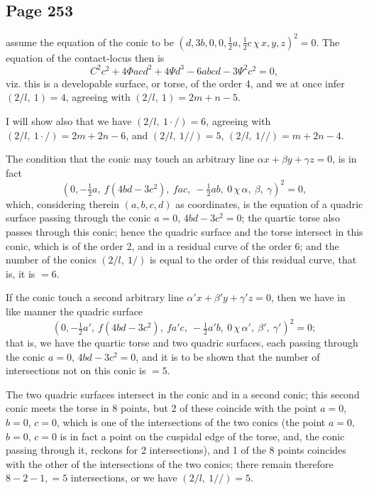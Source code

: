 \documentclass[11pt,a4paper]{article}
\theoremstyle{definition}
\begin{document}
\subsection*{Page 253}

assume the equation of the conic to be $(d, 3b, 0, 0, \tfrac{1}{2}a, \tfrac{1}{2}c \,\chi\, x, y, z)^2 = 0$. The equation of the contact-locus then is
\[
C^2c^2 + 4\Phi acd^2 + 4\Psi d^3 - 6abcd - 3\Psi^2c^2 = 0,
\]
viz. this is a developable surface, or torse, of the order 4, and we at once infer $(2/l,\ 1) = 4$, agreeing with $(2/l,\ 1) = 2m + n - 5$.

I will show also that we have $(2/l,\ 1 \cdot /) = 6$, agreeing with $(2/l,\ 1 \cdot /) = 2m + 2n - 6$, and $(2/l,\ 1 //) = 5$, \quad\quad\quad $(2/l,\ 1 //) = m + 2n - 4$.

The condition that the conic may touch an arbitrary line $\alpha x + \beta y + \gamma z = 0$, is in fact
\[
(0, -\tfrac{1}{2}a,\ f(4bd - 3c^2),\ fac,\ -\tfrac{1}{2}ab,\ 0 \,\chi\, \alpha,\ \beta,\ \gamma)^2 = 0,
\]
which, considering therein $(a, b, c, d)$ as coordinates, is the equation of a quadric surface passing through the conic $a = 0$, $4bd - 3c^2 = 0$; the quartic torse also passes through this conic; hence the quadric surface and the torse intersect in this conic, which is of the order 2, and in a residual curve of the order 6; and the number of the conics $(2/l,\ 1 /)$ is equal to the order of this residual curve, that is, it is $= 6$.

If the conic touch a second arbitrary line $\alpha' x + \beta' y + \gamma' z = 0$, then we have in like manner the quadric surface
\[
(0, -\tfrac{1}{2}a',\ f(4bd - 3c^2),\ fa'c,\ -\tfrac{1}{2}a'b,\ 0 \,\chi\, \alpha',\ \beta',\ \gamma')^2 = 0;
\]
that is, we have the quartic torse and two quadric surfaces, each passing through the conic $a = 0$, $4bd - 3c^2 = 0$, and it is to be shown that the number of intersections not on this conic is $= 5$.

The two quadric surfaces intersect in the conic and in a second conic; this second conic meets the torse in 8 points, but 2 of these coincide with the point $a = 0$, $b = 0$, $c = 0$, which is one of the intersections of the two conics (the point $a = 0$, $b = 0$, $c = 0$ is in fact a point on the cuspidal edge of the torse, and, the conic passing through it, reckons for 2 intersections), and 1 of the 8 points coincides with the other of the intersections of the two conics; there remain therefore $8 - 2 - 1, = 5$ intersections, or we have $(2/l,\ 1 //) = 5$.
\end{document}
